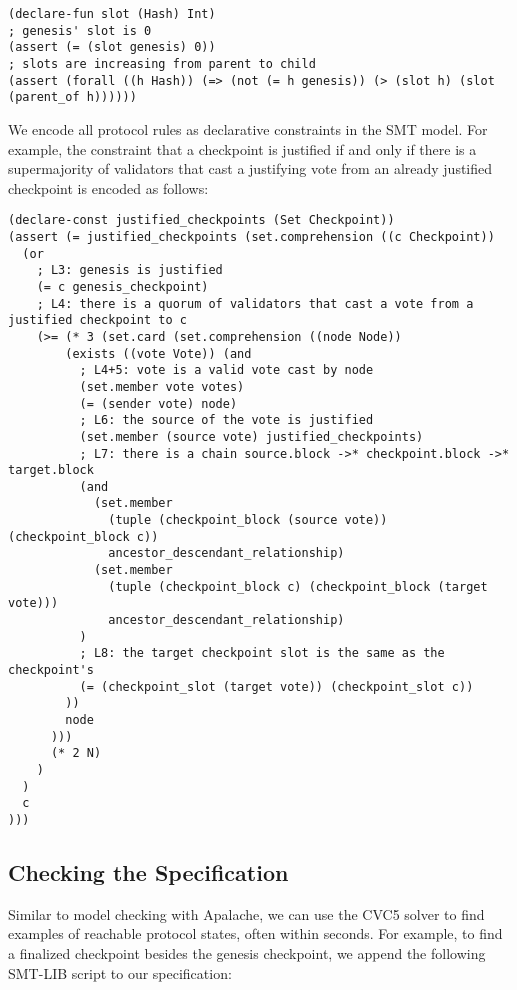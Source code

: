 \begin{lstlisting}[language=smt]
(declare-fun slot (Hash) Int)
; genesis' slot is 0
(assert (= (slot genesis) 0))
; slots are increasing from parent to child
(assert (forall ((h Hash)) (=> (not (= h genesis)) (> (slot h) (slot (parent_of h))))))
\end{lstlisting}

We encode all protocol rules as declarative constraints in the SMT model. For
example, the constraint that a checkpoint is justified if and only if there is
a supermajority of validators that cast a justifying vote from an already
justified checkpoint is encoded as follows:

\begin{lstlisting}[language=smt]
(declare-const justified_checkpoints (Set Checkpoint))
(assert (= justified_checkpoints (set.comprehension ((c Checkpoint))
  (or
    ; L3: genesis is justified
    (= c genesis_checkpoint)
    ; L4: there is a quorum of validators that cast a vote from a justified checkpoint to c
    (>= (* 3 (set.card (set.comprehension ((node Node))
        (exists ((vote Vote)) (and
          ; L4+5: vote is a valid vote cast by node
          (set.member vote votes)
          (= (sender vote) node)
          ; L6: the source of the vote is justified
          (set.member (source vote) justified_checkpoints)
          ; L7: there is a chain source.block ->* checkpoint.block ->* target.block
          (and
            (set.member
              (tuple (checkpoint_block (source vote)) (checkpoint_block c))
              ancestor_descendant_relationship)
            (set.member
              (tuple (checkpoint_block c) (checkpoint_block (target vote)))
              ancestor_descendant_relationship)
          )
          ; L8: the target checkpoint slot is the same as the checkpoint's
          (= (checkpoint_slot (target vote)) (checkpoint_slot c))
        ))
        node
      )))
      (* 2 N)
    )
  )
  c
)))
\end{lstlisting}

\subsection{Checking the Specification}

Similar to model checking with Apalache, we can use the CVC5 solver to find
examples of reachable protocol states, often within seconds. For example, to
find a finalized checkpoint besides the genesis checkpoint, we append the
following SMT-LIB script to our specification:

